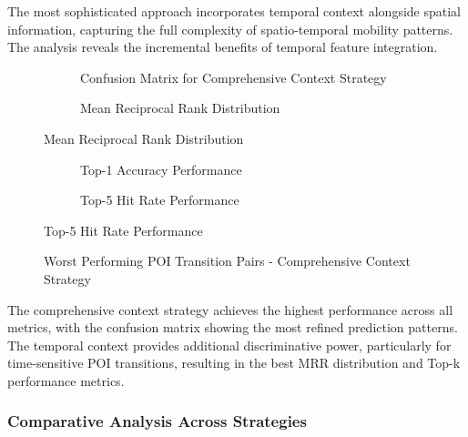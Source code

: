 \documentclass[12pt,a4paper]{article}
\begin{document}
The most sophisticated approach incorporates temporal context alongside spatial information, capturing the full complexity of spatio-temporal mobility patterns. The analysis reveals the incremental benefits of temporal feature integration.

\begin{figure}[h]
\centering
\begin{subfigure}{0.48\textwidth}
\centering
\caption{Confusion Matrix for Comprehensive Context Strategy}
\label{fig:comprehensive_confusion}
\end{subfigure}
\hfill
\begin{subfigure}{0.48\textwidth}
\centering
\caption{Mean Reciprocal Rank Distribution}
\label{fig:comprehensive_mrr}
\end{subfigure}
\end{figure}

\begin{figure}[h]
\centering
\begin{subfigure}{0.48\textwidth}
\centering
\caption{Top-1 Accuracy Performance}
\label{fig:comprehensive_top1}
\end{subfigure}
\hfill
\begin{subfigure}{0.48\textwidth}
\centering
\caption{Top-5 Hit Rate Performance}
\label{fig:comprehensive_top5}
\end{subfigure}
\end{figure}

\begin{figure}[h]
\centering
\caption{Worst Performing POI Transition Pairs - Comprehensive Context Strategy}
\label{fig:comprehensive_worst_pairs}
\end{figure}

The comprehensive context strategy achieves the highest performance across all metrics, with the confusion matrix showing the most refined prediction patterns. The temporal context provides additional discriminative power, particularly for time-sensitive POI transitions, resulting in the best MRR distribution and Top-k performance metrics.

\subsubsection{Comparative Analysis Across Strategies}
\end{document}
